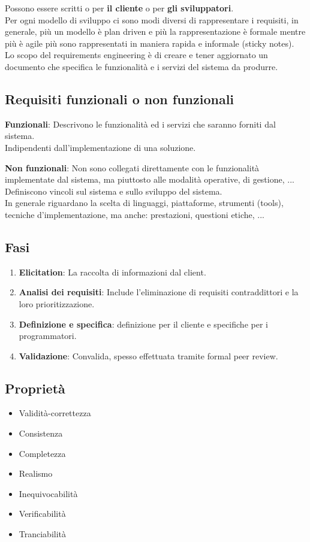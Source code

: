 Possono essere scritti o per \textbf{il cliente} o per \textbf{gli sviluppatori}.\\
Per ogni modello di sviluppo ci sono modi diversi di rappresentare i requisiti, in generale, più un modello \`e plan driven e più la rappresentazione \`e formale mentre più \`e agile più sono rappresentati in maniera rapida e informale (sticky notes).\\
Lo scopo del requirements engineering \`e di creare e tener aggiornato un documento che specifica le funzionalità e i servizi del sistema da produrre.

\subsection{Requisiti funzionali o non funzionali}
\textbf{Funzionali}:
Descrivono le funzionalità ed i servizi che saranno forniti dal sistema.\\
Indipendenti dall'implementazione di una soluzione.

\noindent \textbf{Non funzionali}:
Non sono collegati direttamente con le funzionalità implementate dal sistema, ma piuttosto alle modalità operative, di gestione, ...\\
Definiscono vincoli sul sistema e sullo sviluppo del sistema.\\
In generale riguardano la scelta di linguaggi, piattaforme, strumenti (tools), tecniche d’implementazione, ma anche: prestazioni, questioni etiche, ...

\subsection{Fasi}
\begin{enumerate}
    \item \textbf{Elicitation}: La raccolta di informazioni dal client.
    \item \textbf{Analisi dei requisiti}: Include l'eliminazione di requisiti contraddittori e la loro prioritizzazione.
    \item \textbf{Definizione e specifica}: definizione per il cliente e specifiche per i programmatori.
    \item \textbf{Validazione}: Convalida, spesso effettuata tramite formal peer review.
\end{enumerate}

\subsection{Proprietà}
\begin{itemize}
    \item Validità-correttezza
    \item Consistenza
    \item Completezza
    \item Realismo
    \item Inequivocabilità
    \item Verificabilità
    \item Tranciabilità
\end{itemize}